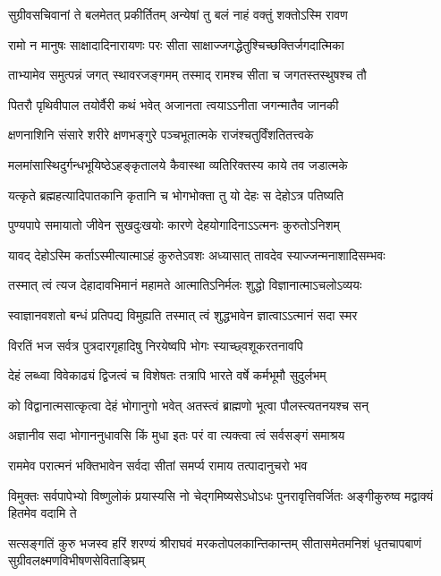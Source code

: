 \twolineshloka
{सुग्रीवसचिवानां ते बलमेतत् प्रकीर्तितम्}
{अन्येषां तु बलं नाहं वक्तुं शक्तोऽस्मि रावण} %

\twolineshloka
{रामो न मानुषः साक्षादादिनारायणः परः}
{सीता साक्षाज्जगद्धेतुश्चिच्छक्तिर्जगदात्मिका} %

\twolineshloka
{ताभ्यामेव समुत्पन्नं जगत् स्थावरजङ्गमम्}
{तस्माद् रामश्च सीता च जगतस्तस्थुषश्च तौ} %

\twolineshloka
{पितरौ पृथिवीपाल तयोर्वैरी कथं भवेत्}
{अजानता त्वयाऽऽनीता जगन्मातैव जानकी} %

\twolineshloka
{क्षणनाशिनि संसारे शरीरे क्षणभङ्गुरे}
{पञ्चभूतात्मके राजंश्चतुर्विंशतितत्त्वके} %

\twolineshloka
{मलमांसास्थिदुर्गन्धभूयिष्ठेऽहङ्कृतालये}
{कैवास्था व्यतिरिक्तस्य काये तव जडात्मके} %

\twolineshloka
{यत्कृते ब्रह्महत्यादिपातकानि कृतानि च}
{भोगभोक्ता तु यो देहः स देहोऽत्र पतिष्यति} %

\twolineshloka
{पुण्यपापे समायातो जीवेन सुखदुःखयोः}
{कारणे देहयोगादिनाऽऽत्मनः कुरुतोऽनिशम्} %

\twolineshloka
{यावद् देहोऽस्मि कर्ताऽस्मीत्यात्माऽहं कुरुतेऽवशः}
{अध्यासात् तावदेव स्याज्जन्मनाशादिसम्भवः} %

\twolineshloka
{तस्मात् त्वं त्यज देहादावभिमानं महामते}
{आत्मातिऽनिर्मलः शुद्धो विज्ञानात्माऽचलोऽव्ययः} %

\twolineshloka
{स्वाज्ञानवशतो बन्धं प्रतिपद्य विमुह्यति}
{तस्मात् त्वं शुद्धभावेन ज्ञात्वाऽऽत्मानं सदा स्मर} %

\twolineshloka
{विरतिं भज सर्वत्र पुत्रदारगृहादिषु}
{निरयेष्वपि भोगः स्याच्छ्वशूकरतनावपि} %

\twolineshloka
{देहं लब्ध्वा विवेकाढ्यं द्विजत्वं च विशेषतः}
{तत्रापि भारते वर्षे कर्मभूमौ सुदुर्लभम्} %

\twolineshloka
{को विद्वानात्मसात्कृत्वा देहं भोगानुगो भवेत्}
{अतस्त्वं ब्राह्मणो भूत्वा पौलस्त्यतनयश्च सन्} %

\twolineshloka
{अज्ञानीव सदा भोगाननुधावसि किं मुधा}
{इतः परं वा त्यक्त्वा त्वं सर्वसङ्गं समाश्रय} %

\twolineshloka
{राममेव परात्मनं भक्तिभावेन सर्वदा}
{सीतां समर्प्य रामाय तत्पादानुचरो भव} %

\threelineshloka
{विमुक्तः सर्वपापेभ्यो विष्णुलोकं प्रयास्यसि}
{नो चेद्गमिष्यसेऽधोऽधः पुनरावृत्तिवर्जितः}
{अङ्गीकुरुष्व मद्वाक्यं हितमेव वदामि ते} %

\fourlineindentedshloka
{सत्सङ्गतिं कुरु भजस्व हरिं शरण्यं}
{श्रीराघवं मरकतोपलकान्तिकान्तम्}
{सीतासमेतमनिशं धृतचापबाणं}
{सुग्रीवलक्ष्मणविभीषणसेविताङ्घ्रिम्} %

